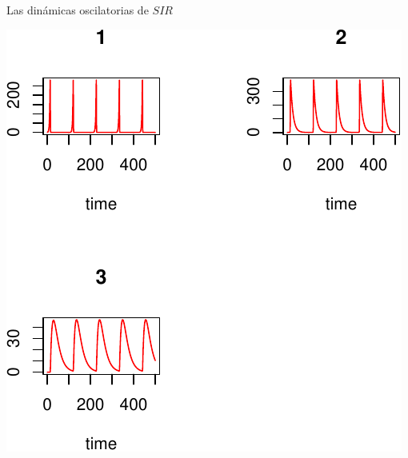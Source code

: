 \documentclass[
  11pt,
  ignorenonframetext,
]{beamer}
\begin{document}
\begin{frame}{Las dinámicas oscilatorias de \(SIR\)}
\begin{center}\includegraphics{Modelos-SI-SIR_files/figure-beamer/unnamed-chunk-5-1} \end{center}
\end{frame}
\end{document}
